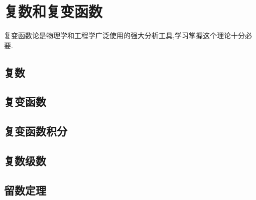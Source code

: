 


\chapter{复数和复变函数}
复变函数论是物理学和工程学广泛使用的强大分析工具,学习掌握这个理论十分必要.
\section{复数}

\section{复变函数}

\label{sec:complexfunctions}





\section{复变函数积分}



\section{复数级数}




% 

\section{留数定理}

